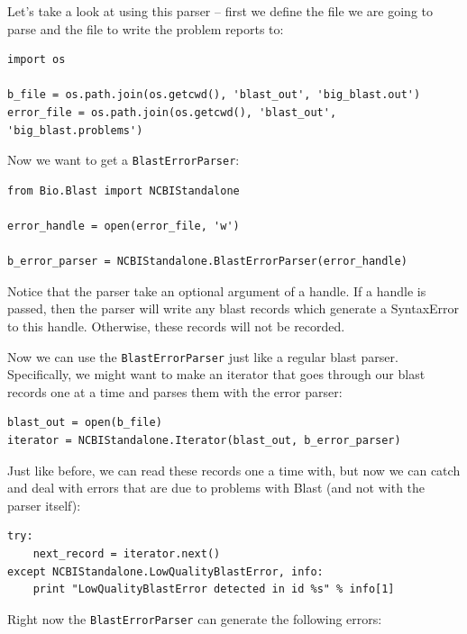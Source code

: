 \documentclass{report}
\begin{document}
Let's take a look at using this parser -- first we define the file we are going to parse and the file to write the problem reports to:

\begin{verbatim}
import os
 
b_file = os.path.join(os.getcwd(), 'blast_out', 'big_blast.out')
error_file = os.path.join(os.getcwd(), 'blast_out', 'big_blast.problems')
\end{verbatim}

Now we want to get a \verb|BlastErrorParser|:

\begin{verbatim}
from Bio.Blast import NCBIStandalone

error_handle = open(error_file, 'w')

b_error_parser = NCBIStandalone.BlastErrorParser(error_handle)
\end{verbatim}

Notice that the parser take an optional argument of a handle. If a handle is passed, then the parser will write any blast records which generate a SyntaxError to this handle. Otherwise, these records will not be recorded.


Now we can use the \verb|BlastErrorParser| just like a regular blast parser. Specifically, we might want to make an iterator that goes through our blast records one at a time and parses them with the error parser:

\begin{verbatim}
blast_out = open(b_file)
iterator = NCBIStandalone.Iterator(blast_out, b_error_parser)
\end{verbatim}

Just like before, we can read these records one a time with, but now we can catch and deal with errors that are due to problems with Blast (and not with the parser itself):

\begin{verbatim}
try:
    next_record = iterator.next()
except NCBIStandalone.LowQualityBlastError, info:
    print "LowQualityBlastError detected in id %s" % info[1]
\end{verbatim}

Right now the \verb|BlastErrorParser| can generate the following errors:
\end{document}
